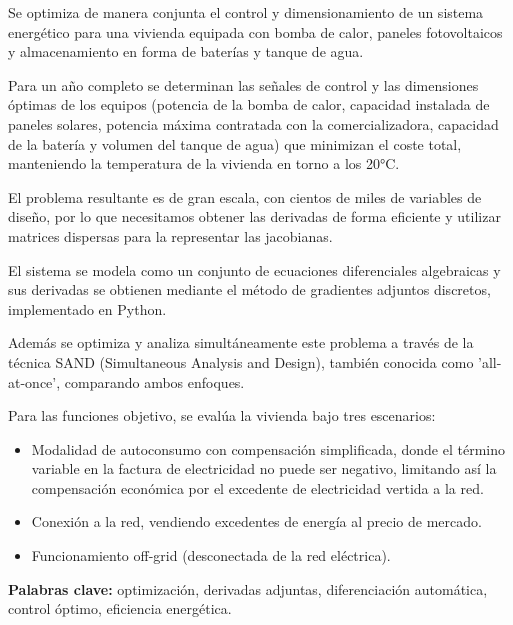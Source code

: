 Se optimiza de manera conjunta el control y dimensionamiento de un sistema
energético para una vivienda equipada con bomba de calor, paneles fotovoltaicos
y almacenamiento en forma de baterías y tanque de agua.

Para un año completo se determinan las señales de control y las dimensiones
óptimas de los equipos (potencia de la bomba de calor, capacidad instalada de
paneles solares, potencia máxima contratada con la comercializadora, capacidad
de la batería y volumen del tanque de agua) que minimizan el coste total,
manteniendo la temperatura de la vivienda en torno a los 20°C.

El problema resultante es de gran escala, con cientos de miles de variables de
diseño, por lo que necesitamos obtener las derivadas de forma eficiente y
utilizar matrices dispersas para la representar las jacobianas.

El sistema se modela como un conjunto de ecuaciones diferenciales algebraicas y
sus derivadas se obtienen mediante el método de gradientes adjuntos discretos,
implementado en Python.

Además se optimiza y analiza simultáneamente este problema a través de la
técnica SAND (Simultaneous Analysis and Design), también conocida como
'all-at-once', comparando ambos enfoques.

Para las funciones objetivo, se evalúa la vivienda bajo tres escenarios:

\begin{itemize}
	\item Modalidad de autoconsumo con compensación simplificada, donde el término
	      variable en la factura de electricidad no puede ser negativo, limitando así la
	      compensación económica por el excedente de electricidad vertida a la red.
	\item Conexión a la red, vendiendo excedentes de energía al precio de mercado.
	\item Funcionamiento off-grid (desconectada de la red eléctrica).
\end{itemize}
\begin{flushleft}
	\textbf{Palabras clave:} optimización, derivadas adjuntas, diferenciación
	automática, control óptimo, eficiencia energética.
\end{flushleft}

